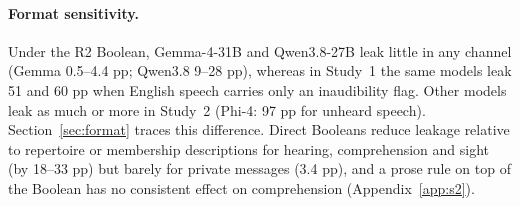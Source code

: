 \documentclass[11pt]{article}
\begin{document}
\paragraph{Format sensitivity.} Under the R2 Boolean, Gemma-4-31B and Qwen3.8-27B leak little in any channel (Gemma 0.5--4.4 pp; Qwen3.8 9--28 pp), whereas in Study~1 the same models leak 51 and 60 pp when English speech carries only an inaudibility flag. Other models leak as much or more in Study~2 (Phi-4: 97 pp for unheard speech). Section~\ref{sec:format} traces this difference. Direct Booleans reduce leakage relative to repertoire or membership descriptions for hearing, comprehension and sight (by 18--33 pp) but barely for private messages (3.4 pp), and a prose rule on top of the Boolean has no consistent effect on comprehension (Appendix~\ref{app:s2}).
\end{document}
